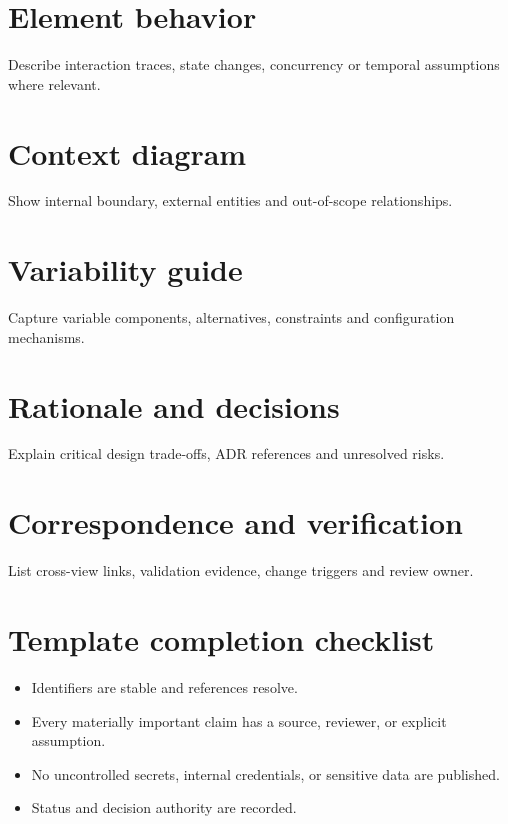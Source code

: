 \documentclass[10pt,letterpaper]{article}
\begin{document}
\section{Element behavior}
Describe interaction traces, state changes, concurrency or temporal assumptions where relevant.

\section{Context diagram}
Show internal boundary, external entities and out-of-scope relationships.

\section{Variability guide}
Capture variable components, alternatives, constraints and configuration mechanisms.

\section{Rationale and decisions}
Explain critical design trade-offs, ADR references and unresolved risks.

\section{Correspondence and verification}
List cross-view links, validation evidence, change triggers and review owner.

\section{Template completion checklist}
\begin{itemize}
\item Identifiers are stable and references resolve.
\item Every materially important claim has a source, reviewer, or explicit assumption.
\item No uncontrolled secrets, internal credentials, or sensitive data are published.
\item Status and decision authority are recorded.
\end{itemize}
\end{document}
